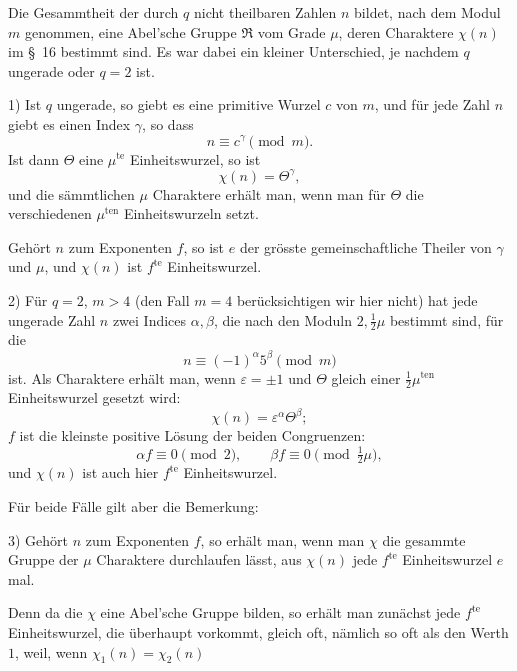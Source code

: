 \documentclass[11pt]{article}
\begin{document}
Die Gesammtheit der durch $q$ nicht theilbaren Zahlen $n$ bildet, nach dem Modul $m$ genommen, eine Abel'sche Gruppe $\mathfrak R$ vom Grade $\mu$, deren Charaktere $\chi(n)$ im \S~16 bestimmt sind. Es war dabei ein kleiner Unterschied, je nachdem $q$ ungerade oder $q=2$ ist.

1) Ist $q$ ungerade, so giebt es eine primitive Wurzel $c$ von $m$, und für jede Zahl $n$ giebt es einen Index $\gamma$, so dass
\begin{equation}
n\equiv c^\gamma\pmod m.
\tag{5}
\end{equation}
Ist dann $\Theta$ eine $\mu^{\mathrm{te}}$ Einheitswurzel, so ist
\begin{equation}
\chi(n)=\Theta^\gamma,
\tag{6}
\end{equation}
und die sämmtlichen $\mu$ Charaktere erhält man, wenn man für $\Theta$ die verschiedenen $\mu^{\mathrm{ten}}$ Einheitswurzeln setzt.

Gehört $n$ zum Exponenten $f$, so ist $e$ der grösste gemeinschaftliche Theiler von $\gamma$ und $\mu$, und $\chi(n)$ ist $f^{\mathrm{te}}$ Einheitswurzel.

2) Für $q=2$, $m>4$ (den Fall $m=4$ berücksichtigen wir hier nicht) hat jede ungerade Zahl $n$ zwei Indices $\alpha,\beta$, die nach den Moduln $2,\frac12\mu$ bestimmt sind, für die
\begin{equation}
n\equiv(-1)^\alpha 5^\beta\pmod m
\tag{7}
\end{equation}
ist. Als Charaktere erhält man, wenn $\varepsilon=\pm1$ und $\Theta$ gleich einer $\frac12\mu^{\mathrm{ten}}$ Einheitswurzel gesetzt wird:
\begin{equation}
\chi(n)=\varepsilon^\alpha\Theta^\beta;
\tag{8}
\end{equation}
$f$ ist die kleinste positive Lösung der beiden Congruenzen:
\[
\alpha f\equiv0\pmod2,\qquad \beta f\equiv0\pmod{\tfrac12\mu},
\]
und $\chi(n)$ ist auch hier $f^{\mathrm{te}}$ Einheitswurzel.

Für beide Fälle gilt aber die Bemerkung:

3) Gehört $n$ zum Exponenten $f$, so erhält man, wenn man $\chi$ die gesammte Gruppe der $\mu$ Charaktere durchlaufen lässt, aus $\chi(n)$ jede $f^{\mathrm{te}}$ Einheitswurzel $e$ mal.

Denn da die $\chi$ eine Abel'sche Gruppe bilden, so erhält man zunächst jede $f^{\mathrm{te}}$ Einheitswurzel, die überhaupt vorkommt, gleich oft, nämlich so oft als den Werth $1$, weil, wenn $\chi_1(n)=\chi_2(n)$
\end{document}
